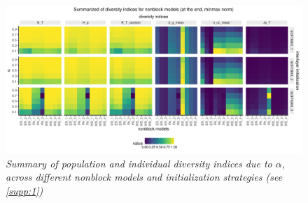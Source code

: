 \begin{figure}[!ht]
    \centering
    \includegraphics[width=\textwidth]{../figures/report/FigS3.pdf}
    \caption{\label{supp:3}
    \textit{Summary  of  population  and  individual  diversity  indices  due  to $\alpha$,  across  different  nonblock  models
    and initialization strategies (see \ref{supp:1})}
    }
\end{figure}
